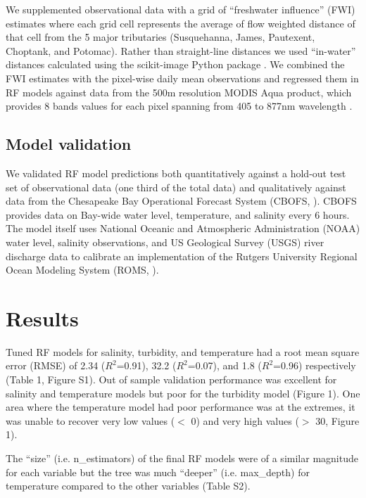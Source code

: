 \documentclass{article}
\begin{document}
We supplemented observational data with a grid of “freshwater influence” (FWI) estimates where each grid cell represents the average of flow weighted distance of that cell from the 5 major tributaries (Susquehanna, James, Pautexent, Choptank, and Potomac). Rather than straight-line distances we used “in-water” distances calculated using the scikit-image Python package \citep{vanderwaltScikitimageImageProcessing2014}. We combined the FWI estimates with the pixel-wise daily mean observations and regressed them in RF models against data from the 500m resolution MODIS Aqua product, which provides 8 bands values for each pixel spanning from 405 to 877nm wavelength \citep{vermoteericMOD09GAMODISTerra2015}.


\subsection{Model validation}

We validated RF model predictions both quantitatively against a hold-out test set of observational data (one third of the total data) and qualitatively against data from the Chesapeake Bay Operational Forecast System (CBOFS, \citet{lanerolle2011second}). CBOFS provides data on Bay-wide water level, temperature, and salinity every 6 hours. The model itself uses National Oceanic and Atmospheric Administration (NOAA) water level, salinity observations, and US Geological Survey (USGS) river discharge data to calibrate an implementation of the Rutgers University Regional Ocean Modeling System (ROMS, \citet{shchepetkinRegionalOceanicModeling2005}).


\section{Results}

Tuned RF models for salinity, turbidity, and temperature had a root mean square error (RMSE) of 2.34 ($R^2$=0.91), 32.2 ($R^2$=0.07), and 1.8 ($R^2$=0.96) respectively (Table 1, Figure S1). Out of sample validation performance was excellent for salinity and temperature models but poor for the turbidity model (Figure 1). One area where the temperature model had poor performance was at the extremes, it was unable to recover very low values ($<$ 0) and very high values ($>$ 30, Figure 1).

The “size” (i.e. n\_estimators) of the final RF models were of a similar magnitude for each variable but the tree was much “deeper” (i.e. max\_depth) for temperature compared to the other variables (Table S2). 
\end{document}
